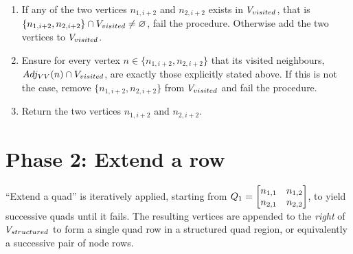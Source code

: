 \begin{enumerate}


\item If any of the two vertices $n_{1,i+2}$ and $n_{2,i+2}$ exists in $V_{visited}$, that is $\{ n_{1,i+2} , n_{2,i+2} \} \cap V_{visited} \neq \varnothing$, fail the procedure.
Otherwise add the two vertices to $V_{visited}$.

\item Ensure for every vertex $n \in \{ n_{1,i+2} , n_{2,i+2} \}$ that its visited neighbours, $Adj_{VV}(n) \cap V_{visited}$, are exactly those explicitly stated above. If this is not the case, remove $\{ n_{1,i+2} , n_{2,i+2} \}$ from $V_{visited}$ and fail the procedure.

\item Return the two vertices $n_{1,i+2}$ and $n_{2,i+2}$.
\end{enumerate}








\section{Phase 2: Extend a row}
``Extend a quad'' is iteratively applied, starting from $Q_1 = \begin{bmatrix} n_{1,1} & n_{1,2} \\ n_{2,1} & n_{2,2} \end{bmatrix}$, to yield successive quads until it fails.
The resulting vertices are appended to the \emph{right} of $V_{structured}$ to form a single quad row in a structured quad region, or equivalently a successive pair of node rows.


